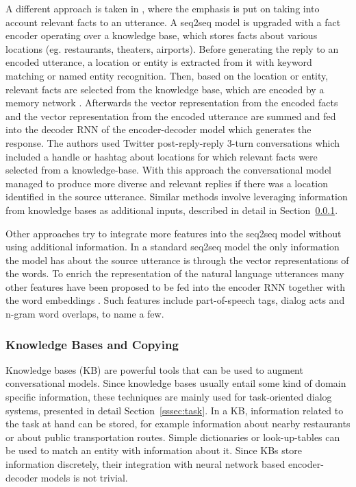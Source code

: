 \documentclass[12pt]{article}
\begin{document}
A different approach is taken in \cite{Ghazvininejad:2017}, where the emphasis is put on taking into account relevant facts to an utterance. A seq2seq model is upgraded with a fact encoder operating over a knowledge base, which stores facts about various locations (eg. restaurants, theaters, airports). Before generating the reply to an encoded utterance, a location or entity is extracted from it with keyword matching or named entity recognition. Then, based on the location or entity, relevant facts are selected from the knowledge base, which are encoded by a memory network \cite{Sukhbaatar:2015}. Afterwards the vector representation from the encoded facts and the vector representation from the encoded utterance are summed and fed into the decoder RNN of the encoder-decoder model which generates the response. The authors used Twitter post-reply-reply 3-turn conversations which included a handle or hashtag about locations for which relevant facts were selected from a knowledge-base. With this approach the conversational model managed to produce more diverse and relevant replies if there was a location identified in the source utterance. Similar methods involve leveraging information from knowledge bases as additional inputs, described in detail in Section~\ref{sssec:KB}. 

Other approaches try to integrate more features into the seq2seq model without using additional information. In a standard seq2seq model the only information the model has about the source utterance is through the vector representations of the words. To enrich the representation of the natural language utterances many other features have been proposed to be fed into the encoder RNN together with the word embeddings \cite{Sordoni:2015, Serban_MrRNN:2017,Serban:2017}. Such features include part-of-speech tags, dialog acts and n-gram word overlaps, to name a few.

\subsubsection{Knowledge Bases and Copying} \label{sssec:KB}
Knowledge bases (KB) are powerful tools that can be used to augment conversational models. Since knowledge bases usually entail some kind of domain specific information, these techniques are mainly used for task-oriented dialog systems, presented in detail Section~\ref{sssec:task}. In a KB, information related to the task at hand can be stored, for example information about nearby restaurants or about public transportation routes. Simple dictionaries or look-up-tables can be used to match an entity with information about it. Since KBs store information discretely, their integration with neural network based encoder-decoder models is not trivial.
\end{document}
